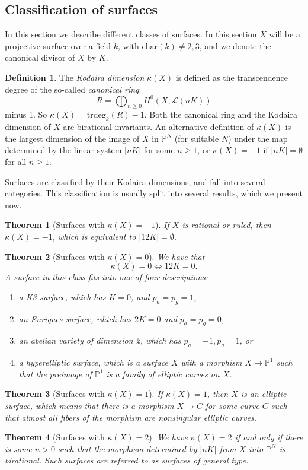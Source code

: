 \documentclass[12pt,twoside]{reedthesis}
\theoremstyle{plain}
\newtheorem{theorem}{Theorem}[chapter]
\theoremstyle{definition}
\newtheorem{definition}{Definition}[section]
\theoremstyle{remark}
\newcommand{\Proj}{\mathbb{P}}
\begin{document}
\subsection{Classification of surfaces}
In this section we describe different classes of surfaces. In this section $X$ will be a projective surface over a field $k$, with $\text{char}(k)\neq2,3$, and we denote the canonical divisor of $X$ by $K$.
\begin{definition}
The \emph{Kodaira dimension} $\kappa(X)$ is defined as the transcendence degree of the so-called \emph{canonical ring}:
\[R=\bigoplus_{n\geq0}H^0(X,\mathcal{L}(nK))\]
minus 1. So $\kappa(X)=\text{trdeg}_k(R)-1$. Both the canonical ring and the Kodaira dimension of $X$ are birational invariants. An alternative definition of $\kappa(X)$ is the largest dimension of the image of $X$ in $\Proj^N$ (for suitable $N$) under the map determined by the linear system $|nK|$ for some $n\geq1$, or $\kappa(X)=-1$ if $|nK|=\emptyset$ for all $n\geq1$.
\end{definition}
Surfaces are classified by their Kodaira dimensions, and fall into several categories. This classification is usually split into several results, which we present now.
\begin{theorem}[Surfaces with $\kappa(X)=-1$]
If $X$ is \emph{rational} or \emph{ruled}, then $\kappa(X)=-1$, which is equivalent to $|12K|=\emptyset$.
\end{theorem}
\begin{theorem}[Surfaces with $\kappa(X)=0$]\label{classification}
We have that \[\kappa(X)=0\iff 12K=0.\] A surface in this class fits into one of four descriptions:
\begin{enumerate}
\item a \emph{K3 surface}, which has $K=0$, and $p_a=p_g=1$,
\item an \emph{Enriques surface}, which has $2K=0$ and $p_a=p_g=0$,
\item an \emph{abelian variety of dimension 2}, which has $p_a=-1,p_g=1$, or
\item a \emph{hyperelliptic surface}, which is a surface $X$ with a morphism $X\to\Proj^1$ such that the preimage of $\Proj^1$ is a family of elliptic curves on $X$.
\end{enumerate}
\end{theorem}
\begin{theorem}[Surfaces with $\kappa(X)=1$]
If $\kappa(X)=1$, then $X$ is an \emph{elliptic surface}, which means that there is a morphism $X\to C$ for some curve $C$ such that almost all fibers of the morphism are nonsingular elliptic curves.
\end{theorem}
\begin{theorem}[Surfaces with $\kappa(X)=2$]
We have $\kappa(X)=2$ if and only if there is some $n>0$ such that the morphism determined by $|nK|$ from $X$ into $\Proj^N$ is birational. Such surfaces are referred to as \emph{surfaces of general type}. 
\end{theorem}
\end{document}

